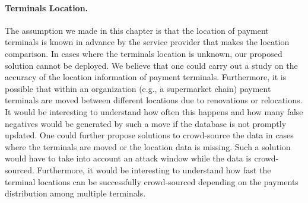 \paragraph{Terminals Location.} The assumption we made in this chapter is that the location of payment terminals is known in advance by the service provider that makes the location comparison. In cases where the terminals location is unknown, our proposed solution cannot be deployed. We believe that one could carry out a study on the accuracy of the location information of payment terminals. Furthermore, it is possible that within an organization (e.g., a supermarket chain) payment terminals are moved between different locations due to renovations or relocations. It would be interesting to understand how often this happens and how many false negatives would be generated by such a move if the database is not promptly updated. One could further propose solutions to crowd-source the data in cases where the terminals are moved or the location data is missing. Such a solution would have to take into account an attack window while the data is crowd-sourced. Furthermore, it would be interesting to understand how fast the terminal locations can be successfully crowd-sourced depending on the payments distribution among multiple terminals.


